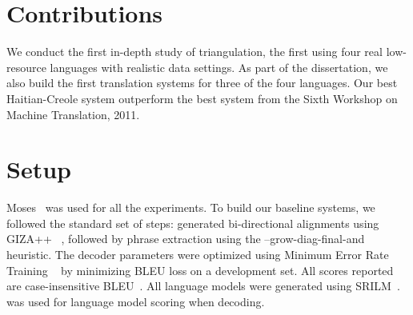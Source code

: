 \section{Contributions}
\label{sec:summary}
We conduct the first in-depth study of triangulation, the first using four real low-resource languages with realistic data settings. As part of the dissertation, we also build the first translation systems for three of the four languages. Our best Haitian-Creole system outperform the best system from the Sixth Workshop on Machine Translation, 2011. 


\section{Setup}
\label{sec:setup}


Moses~\cite{Koehn:07} was used for all the experiments. To build our baseline systems, we followed the standard set of steps: generated bi-directional alignments using GIZA++ ~\cite{OchNey:03}, followed by phrase extraction using the --grow-diag-final-and heuristic. The decoder parameters were optimized using Minimum Error Rate Training ~\cite{Och:03} by minimizing BLEU loss on a development set. All scores reported are case-insensitive BLEU~\cite{Papineni:02}. All language models were generated using SRILM~\cite{Stolcke:02}.~\cite{Ken:11} was used for language model scoring when decoding.